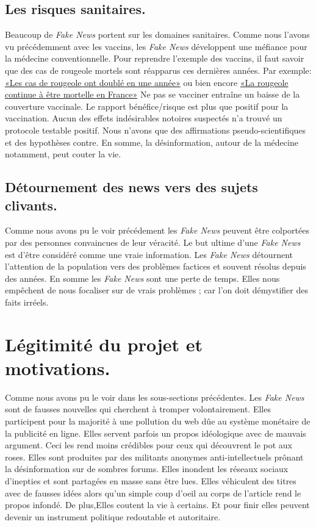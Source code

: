 \documentclass[11pt,a4paper,oldfontcommands]{memoir}
\begin{document}
\subsection{Les risques sanitaires.}
Beaucoup de \textit{Fake News} portent sur les domaines sanitaires.
Comme nous l'avons vu précédemment avec les vaccins, les \textit{Fake News} développent une méfiance pour la médecine conventionnelle.
Pour reprendre l'exemple des vaccins, il faut savoir que des cas de rougeole mortels sont réapparus ces dernières années.
Par exemple:
\href{https://www.tdg.ch/suisse/Les-cas-de-rougeole-ont-double-en-une-annee/story/25575100}{«Les cas de rougeole ont doublé en une année»} ou bien encore \href{https://www.la-croix.com/Sciences-et-ethique/Sante/rougeole-continue-etre-mortelle-France-2018-02-13-1200913536}{«La rougeole continue à être mortelle en France»}
Ne pas se vacciner entraîne un baisse de la couverture vaccinale.
Le rapport bénéfice/risque est plus que positif pour la vaccination.
Aucun des effets indésirables notoires suspectés n'a trouvé un protocole testable positif.
Nous n'avons que des affirmations pseudo-scientifiques et des hypothèses contre.
En somme, la désinformation, autour de la médecine notamment, peut couter la vie.



\subsection{Détournement des news vers des sujets clivants.}
Comme nous avons pu le voir précédement les \textit{Fake News} peuvent être colportées par des personnes convaincues de leur véracité.
Le but ultime d'une \textit{Fake News} est d'être considéré comme une vraie information.
Les \textit{Fake News} détournent l'attention de la population vers des problèmes factices et souvent résolus depuis des années. En somme les \textit{Fake News} sont une perte de temps. Elles nous empêchent de nous focaliser sur de vrais problèmes ; car l'on doit démystifier des faits irréels.



\section{Légitimité du projet et motivations.}

Comme nous avons pu le voir dans les sous-sections précédentes.
Les \textit{Fake News} sont de fausses nouvelles qui cherchent à tromper volontairement.
Elles participent pour la majorité à une pollution du web dûe au système monétaire de la publicité en ligne.
Elles servent parfois un propos idéologique avec de mauvais argument.
Ceci les rend moins crédibles pour ceux qui découvrent le pot aux roses.
Elles sont produites par des militants anonymes anti-intellectuels prônant la désinformation sur de sombres forums.
Elles inondent les réseaux sociaux d'inepties et sont partagées en masse sans être lues.
Elles véhiculent des titres avec de fausses idées alors qu'un simple coup d'oeil au corps de l'article rend le propos infondé.
De plus,Elles coutent la vie à certains.
Et pour finir elles peuvent devenir un instrument politique redoutable et autoritaire.
\end{document}
